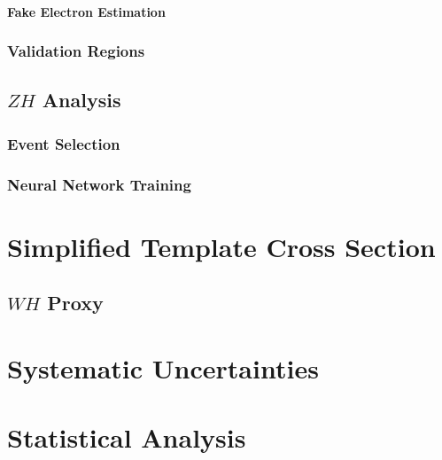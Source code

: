 \documentclass{umassthesis}          %
\begin{document}
\subsubsection{Fake Electron Estimation}\label{sec:vh_wh_fake_electron_estimation}

% 
\subsection{Validation Regions}\label{sec:vh_wh_validation_regions}

\section{\texorpdfstring{$ZH$}{ZH} Analysis}\label{sec:vh_zh_analysis}

\subsection{Event Selection}\label{sec:vh_zh_event_selection}

\subsection{Neural Network Training}\label{sec:vh_zh_nn_training}


\chapter{Simplified Template Cross Section}\label{ch:stxs}

\section{$WH$ \ptw{} Proxy}\label{sec:stxs_wh_ptv}


\chapter{Systematic Uncertainties}\label{ch:systematics}


\chapter{Statistical Analysis}\label{ch:statistical_analysis}

\end{document}
